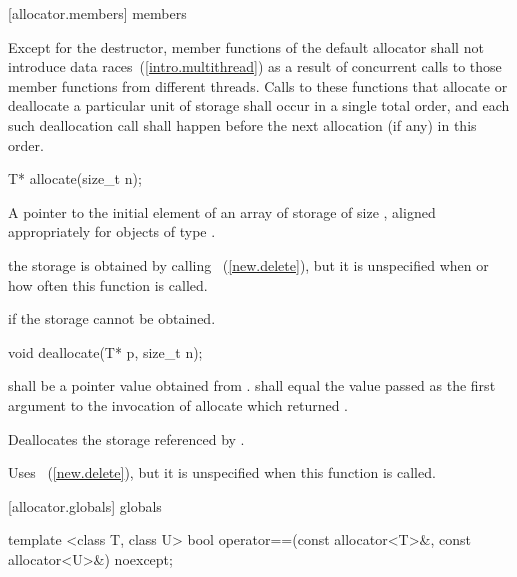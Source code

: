 [allocator.members]{ members}

\pnum
Except for the destructor, member functions of the default allocator shall not introduce
data races~(\ref{intro.multithread}) as a result of concurrent calls to those member
functions from different threads. Calls to these functions that allocate or deallocate a
particular unit of storage shall occur in a single total order, and each such
deallocation call shall happen before the next allocation (if any) in this order.

%
\begin{itemdecl}
T* allocate(size_t n);
\end{itemdecl}

\begin{itemdescr}
\pnum
\returns
A pointer to the initial element of an array of storage of size 
, aligned appropriately for objects of type .

\pnum
\remark
the storage is obtained by calling ~(\ref{new.delete}),
but it is unspecified when or how often this
function is called.

\pnum
\throws
{} if the storage cannot be obtained.
\end{itemdescr}

%
\begin{itemdecl}
void deallocate(T* p, size_t n);
\end{itemdecl}

\begin{itemdescr}
\pnum
\requires
{} shall be a pointer value obtained from .
 shall equal the value passed as the first argument
to the invocation of allocate which returned .

\pnum
\effects
Deallocates the storage referenced by  .

\pnum
\remarks
Uses
~(\ref{new.delete}),
but it is unspecified
when this function is called.
\end{itemdescr}

[allocator.globals]{ globals}

%
\begin{itemdecl}
template <class T, class U>
  bool operator==(const allocator<T>&, const allocator<U>&) noexcept;
\end{itemdecl}

